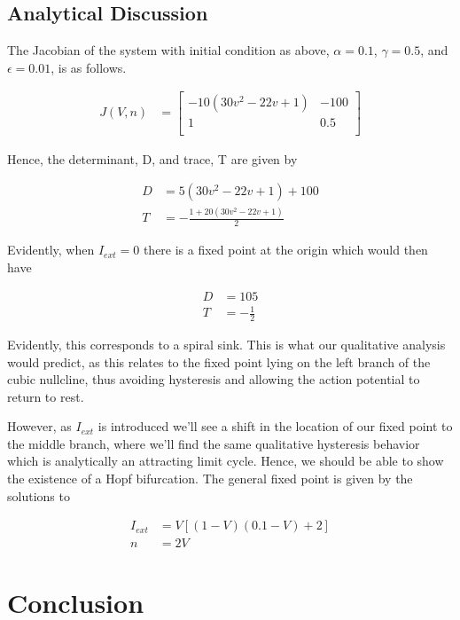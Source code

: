 \documentclass{article}
\begin{document}
\subsection{Analytical Discussion}

The Jacobian of the system with initial condition as above, $\alpha = 0.1$, $\gamma = 0.5$, and $\epsilon = 0.01$, is as follows.

\begin{align*}
J(V,n) &= \begin{bmatrix}
    -10(30v^2-22v+1)     & -100 \\
    1      & 0.5 \\
\end{bmatrix}
\end{align*}

Hence, the determinant, D, and trace, T are given by

\begin{align*}
D &= 5(30v^2-22v+1)+100 \\
T &= -\frac{1+20(30v^2-22v+1)}{2}
\end{align*}

Evidently, when $I_{ext}=0$ there is a fixed point at the origin which would then have

\begin{align*}
D &= 105 \\
T &= -\frac{1}{2}
\end{align*}

Evidently, this corresponds to a spiral sink. This is what our qualitative analysis would predict, as this relates to the fixed point lying on the left branch of the cubic nullcline, thus avoiding hysteresis and allowing the action potential to return to rest.

However, as $I_{ext}$ is introduced we'll see a shift in the location of our fixed point to the middle branch, where we'll find the same qualitative hysteresis behavior which is analytically an attracting limit cycle. Hence, we should be able to show the existence of a Hopf bifurcation. The general fixed point is given by the solutions to 

\begin{align*}
I_{ext} &= V[(1-V)(0.1-V)+2] \\
n &= 2V
\end{align*}

\section{Conclusion}
\end{document}
